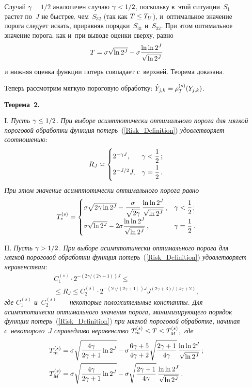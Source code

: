 \begin{multicols}{2}
Случай $\gamma=1/2$ аналогичен случаю $\gamma\hm<1/2$, по\-сколь\-ку в~этой ситуации~$S_1$ рас\-тет по~$J$ 
не быст\-рее, чем~$S_{32}$ (так как $T\hm\le T_U$), и~оптимальное значение порога 
следует искать, приравняв порядки~$S_{31}$ и~$S_{32}$. При этом оптимальное значение порога,
 как и~при выводе оцен\-ки свер\-ху, равно
$$
T =\sigma\sqrt{\ln2^J}-\sigma\displaystyle\frac{\displaystyle \ln\ln2^J\mathstrut}{\displaystyle \sqrt{\ln2^J}\mathstrut}
$$
и ниж\-няя оценка функции потерь сов\-па\-да\-ет с~верх\-ней. Тео\-ре\-ма доказана.

Теперь рас\-смот\-рим мягкую пороговую обработку: $\hat{Y}_{j,k}\hm=\rho_T^{(s)}(Y_{j,k})$.

\smallskip

\noindent
\textbf{Теорема~2.}\

I. \textit{Пусть $\gamma\hm\le1/2$. При выборе асимп\-то\-ти\-че\-ски оптимального порога для мяг\-кой 
пороговой обработки функция потерь}~(\ref{Risk_Definition}) \textit{удовле\-тво\-ря\-ет соотношению}:
$$
R_J\asymp
\begin{cases}
2^{-\gamma J}, & \gamma<\displaystyle\frac{\displaystyle 1\mathstrut}{\displaystyle 2\mathstrut}\,;\\
  2^{-J/2}J, & \gamma=\displaystyle\frac{\displaystyle 1\mathstrut}{\displaystyle 2\mathstrut}\,.
  \end{cases}
$$
\textit{При этом значение асимп\-то\-ти\-че\-ски оптимального порога равно}
$$
T_*^{(s)}=\begin{cases}
\sigma\sqrt{2\gamma\ln2^J}-\displaystyle\frac{\displaystyle \sigma\mathstrut}{\displaystyle \sqrt{2\gamma}\mathstrut}\,\displaystyle\frac{\displaystyle \ln{\ln2^J}\mathstrut}{\displaystyle \sqrt{\ln2^J}\mathstrut}\,, 
& \gamma<\displaystyle\frac{\displaystyle 1\mathstrut}{\displaystyle 2\mathstrut};\\
\sigma\sqrt{\ln2^J}-2\sigma\displaystyle\frac{\displaystyle \ln{\ln2^J}\mathstrut}{\displaystyle \sqrt{\ln2^J}\mathstrut}\,, & \gamma=\displaystyle\frac{\displaystyle 1\mathstrut}{\displaystyle 2\mathstrut}\,.
\end{cases}
$$

II. \textit{Пусть $\gamma\hm>1/2$. При выборе асимп\-то\-ти\-че\-ски оптимального порога для мяг\-кой 
пороговой обработки функция потерь}~(\ref{Risk_Definition}) \textit{удовле\-тво\-ря\-ет неравенствам}:
\begin{multline*}
C_1^{(s)}\cdot2^{-(2\gamma/(2\gamma+1))J}
\le {}\\
{}\le R_J\le C_2^{(s)}\cdot
2^{-(2\gamma/({2\gamma+1}))J}
J^{({2\gamma+3})/({4\gamma+2})},
\end{multline*}
\textit{где $C_1^{(s)}$ и~$C_2^{(s)}$~--- некоторые положительные константы.
Для асимп\-то\-ти\-че\-ски оптимального значения порога, ми\-ни\-ми\-зи\-ру\-юще\-го порядок функции 
потерь}~(\ref{Risk_Definition}) \textit{при мяг\-кой пороговой обработке, начиная с~некоторого~$J$ 
справедливо неравенство $T_m^{(s)}\hm\le T\hm\le T_M^{(s)}$,~где}
\begin{align*}
T_m^{(s)}&= \sigma\sqrt{\displaystyle\frac{\displaystyle 4\gamma\mathstrut}{\displaystyle 2\gamma+1\mathstrut}\ln2^J}
-\sigma\displaystyle\frac{\displaystyle 6\gamma+5\mathstrut}{\displaystyle 4\gamma+2\mathstrut}
\sqrt{\displaystyle\frac{\displaystyle 2\gamma+1\mathstrut}{\displaystyle 4\gamma\mathstrut}}\,\displaystyle\frac{\displaystyle \ln\ln2^J\mathstrut}{\displaystyle \sqrt{\ln2^J}\mathstrut}\,;
\\
T_M^{(s)}&=\sigma\sqrt{\displaystyle\frac{\displaystyle 4\gamma\mathstrut}{\displaystyle 2\gamma+1\mathstrut}\ln 2^J}-\sigma\sqrt{\displaystyle\frac{\displaystyle 2\gamma+1\mathstrut}{\displaystyle {4\gamma }\mathstrut}}\,
\displaystyle\frac{\displaystyle \ln\ln2^J\mathstrut}{\displaystyle \sqrt{\ln2^J}\mathstrut}\,.
\end{align*}



\end{multicols}
